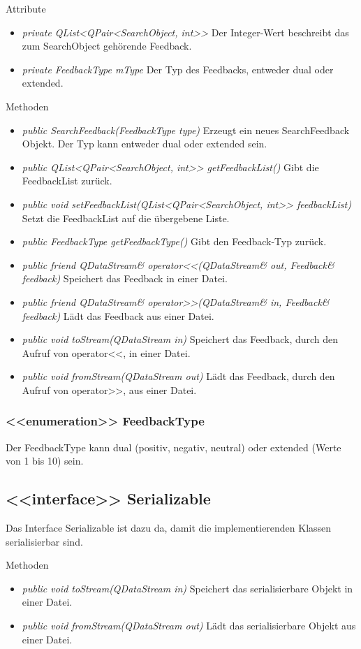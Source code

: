 Attribute
\begin{itemize}
\item\textit{private QList<QPair<SearchObject, int>>} Der Integer-Wert beschreibt das zum SearchObject gehörende Feedback.
\item\textit{private FeedbackType mType} Der Typ des Feedbacks, entweder dual oder extended.
\end{itemize}

Methoden
\begin{itemize}
\item \textit{public SearchFeedback(FeedbackType type)} Erzeugt ein neues SearchFeedback Objekt. Der Typ kann entweder dual oder extended sein.
\item \textit{public QList<QPair<SearchObject, int>>  getFeedbackList()} Gibt die FeedbackList  zurück.
\item \textit{public void setFeedbackList(QList<QPair<SearchObject, int>> feedbackList)} Setzt die FeedbackList auf die übergebene Liste.
\item \textit{public FeedbackType getFeedbackType()} Gibt den Feedback-Typ zurück.
\item \textit{public friend QDataStream\& operator<<(QDataStream\& out, Feedback\& feedback)} Speichert das Feedback in einer Datei.
\item \textit{public friend QDataStream\& operator>>(QDataStream\& in, Feedback\& feedback)} Lädt das Feedback aus einer Datei.
\item \textit{public void toStream(QDataStream in)} Speichert das Feedback, durch den Aufruf von operator<<, in einer Datei.
\item \textit{public void fromStream(QDataStream out)} Lädt das Feedback, durch den Aufruf von operator>>, aus einer Datei.
\end{itemize} 

\subsubsection*{<<enumeration>> FeedbackType}
Der FeedbackType kann dual (positiv, negativ, neutral) oder extended (Werte von 1 bis 10) sein.

\subsection*{<<interface>> Serializable}
Das Interface Serializable ist dazu da, damit die implementierenden Klassen serialisierbar sind.

Methoden
\begin{itemize}
\item \textit{public void toStream(QDataStream in)} Speichert das serialisierbare Objekt in einer Datei.
\item \textit{public void fromStream(QDataStream out)} Lädt das serialisierbare Objekt aus einer Datei.
\end{itemize}

